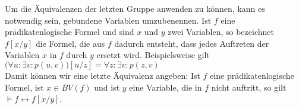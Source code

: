 Um die Äquivalenzen der letzten Gruppe anwenden zu können, kann es notwendig sein,
gebundene Variablen umzubenennen. Ist $f$ eine prädikatenlogische Formel und sind $x$ und
$y$ zwei Variablen, so bezeichnet $f[x/y]$ die Formel, die aus $f$ dadurch entsteht, dass
jedes Auftreten der Variablen $x$ in $f$ durch $y$ ersetzt wird.  Beispielsweise gilt \\[0.2cm]
\hspace*{1.3cm} $\bigl(\forall u : \exists v : p(u,v)\bigr)[u/z] = \forall z : \exists v : p(z,v)$
\\[0.2cm]
Damit können wir eine letzte Äquivalenz angeben: Ist $f$ eine prädikatenlogische Formel,
ist $x \in BV(f)$ und ist $y$ eine Variable, die in $f$ nicht auftritt, so gilt \\[0.2cm]
\hspace*{1.3cm} $\models f \leftrightarrow f[x/y]$.
\vspace{0.3cm}


